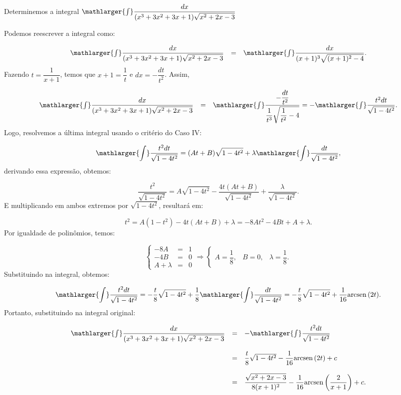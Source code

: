 \cleardoublepage\documentclass[../main.tex]{subfiles}
\begin{document}
\begin{ex}
Determinemos a integral \(\mathlarger{\int} \dfrac{dx}{(x^3+3x^2+3x+1)\sqrt{x^2+2x-3}}\)

\begin{solution}
Podemos reescrever a integral como:

\[ \begin{array}{rcl} \mathlarger{\int} \dfrac{dx}{(x^3+3x^2+3x+1)\sqrt{x^2+2x-3}}&=&\mathlarger{\int} \dfrac{dx}{(x+1)^3\sqrt{(x+1)^2-4}}. \end{array} \]
Fazendo \(t=\dfrac{1}{x+1}\), temos que \(x+1=\dfrac{1}{t}\) e \(dx=-\dfrac{dt}{t^2}\). Assim,

\[ \begin{array}{rcl} \mathlarger{\int} \dfrac{dx}{(x^3+3x^2+3x+1)\sqrt{x^2+2x-3}}&=& \mathlarger{\int} \dfrac{-\dfrac{dt}{t^2}}{\dfrac{1}{t^3}\sqrt{\dfrac{1}{t^2}-4}}= - \mathlarger{\int}\dfrac{t^2dt}{\sqrt{1-4t^2}}. \end{array} \]
Logo, resolvemos a última integral usando o critério do Caso IV:

\[ \mathlarger{\int}\dfrac{t^2dt}{\sqrt{1-4t^2}}=(At+B)\sqrt{1-4t^2} +\lambda\mathlarger{\int}\dfrac{dt}{\sqrt{1-4t^2}}, \]
derivando essa expressão, obtemos:

\[ \dfrac{t^2}{\sqrt{1-4t^2}}=A\sqrt{1-4t^2}-\dfrac{4t(At+B)}{\sqrt{1-4t^2}} +\dfrac{\lambda}{\sqrt{1-4t^2}}. \]
E multiplicando em ambos extremos por \( \sqrt{1-4t^2}\), resultará em:

\[ t^2=A(1-t^2)-4t(At+B)+\lambda= -8At^2-4Bt+A+\lambda. \]
Por igualdade de polinômios, temos:

\[ \left\{ \begin{array}{rcr} -8A &=&1\\ -4B &=&0\\ A+\lambda&=&0 \end{array} \right. \Rightarrow \left\{ \begin{array}{ccc} A=\dfrac{1}{8},&B=0,&\lambda=\dfrac{1}{8}. \end{array} \right. \]
Substituindo na integral, obtemos:

\[ \mathlarger{\int}\dfrac{t^2dt}{\sqrt{1-4t^2}}=-\dfrac{t}{8}\sqrt{1-4t^2} +\dfrac{1}{8}\mathlarger{\int}\dfrac{dt}{\sqrt{1-4t^2}} =-\dfrac{t}{8}\sqrt{1-4t^2} +\dfrac{1}{16}{\rm arcsen\,}(2t) . \]
Portanto, substituindo na integral original:

\[ \begin{array}{rcl} \mathlarger{\int} \dfrac{dx}{(x^3+3x^2+3x+1)\sqrt{x^2+2x-3}}&=&- \mathlarger{\int}\dfrac{t^2dt}{\sqrt{1-4t^2}}\\ \\ &=&\dfrac{t}{8}\sqrt{1-4t^2} -\dfrac{1}{16}{\rm arcsen\,}(2t)+c\\ \\ &=&\dfrac{\sqrt{x^2+2x-3}}{8(x+1)^2} -\dfrac{1}{16}{\rm arcsen}\left(\dfrac{2}{x+1}\right)+c. \end{array} \]
\end{solution}
\end{ex}
\end{document}
